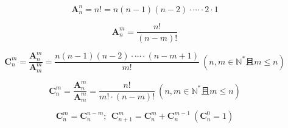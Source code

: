 \documentclass[a5paper]{article}
\begin{document}
\begin{equation*}
    \textbf{A}_{n}^{n} = n! = n(n-1)(n-2) \cdot \cdots{} \cdot 2 \cdot 1
\end{equation*}

\begin{equation*}
    \textbf{A}_n^{m} = \frac{n!}{(n-m)!}
\end{equation*}

\begin{equation*}
    \textbf{C}_{n}^m = \frac{\textbf{A}_n^{m}}{\textbf{A}_m^{m}} = \frac{n(n-1)(n-2) \cdot \cdots{} \cdot (n-m+1)}{m!}~(n,m \in \mathbb{N}^* \text{且} m \le n)
\end{equation*}

\begin{equation*}
    \textbf{C}_{n}^m = \frac{\textbf{A}_n^{m}}{\textbf{A}_m^{m}} = \frac{n!}{m! \cdot (n-m)!}~(n,m \in \mathbb{N}^* \text{且} m \le n)
\end{equation*}

\begin{equation*}
    \textbf{C}_n^{m} = \textbf{C}_{n}^{n-m};~~\textbf{C}_{n+1}^{m} = \textbf{C}_n^{m} + \textbf{C}_n^{m-1}~(\textbf{C}_n^{0} = 1)
\end{equation*}
\end{document}
